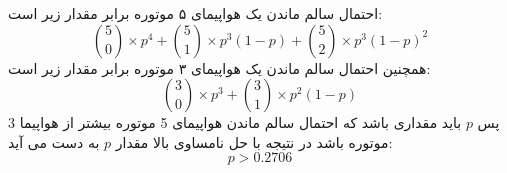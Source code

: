 
احتمال سالم ماندن یک هواپیمای ۵ موتوره برابر مقدار زیر است:
$${5 \choose 0} \times p ^ 4  + {5 \choose 1} \times p ^ 3 (1 - p) + {5 \choose 2} \times p ^ 3 (1 - p) ^ 2$$
همچنین احتمال سالم ماندن یک هواپیمای ۳ موتوره برابر مقدار زیر است:
$$ {3 \choose 0} \times p ^ 3 + {3 \choose 1} \times p ^ 2(1 - p) $$
پس $p$ باید مقداری باشد که احتمال سالم ماندن هواپیمای 5 موتوره بیشتر از هواپیما 3 موتوره باشد در نتیجه با حل نامساوی بالا مقدار $p$ به دست می آید:
$$ p > 0.2706$$
